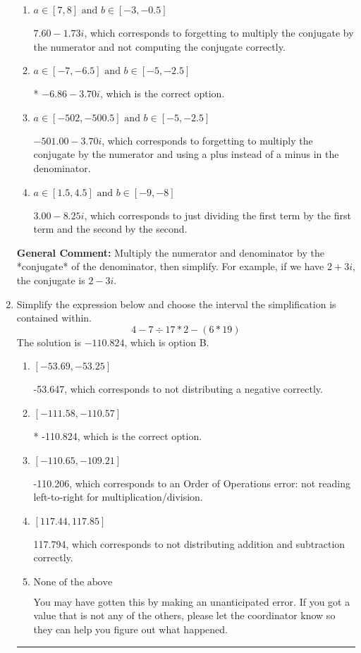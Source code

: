 \documentclass{extbook}[14pt]
\newcommand{\litem}[1]{\item #1

\rule{\textwidth}{0.4pt}}
\begin{document}
\begin{enumerate}
{\begin{enumerate}[label=\Alph*.]
 $-6.86  - 270.00 i$, which corresponds to forgetting to multiply the conjugate by the numerator.
\item \( a \in [7, 8] \text{ and } b \in [-3, -0.5] \)

 $7.60  - 1.73 i$, which corresponds to forgetting to multiply the conjugate by the numerator and not computing the conjugate correctly.
\item \( a \in [-7, -6.5] \text{ and } b \in [-5, -2.5] \)

* $-6.86  - 3.70 i$, which is the correct option.
\item \( a \in [-502, -500.5] \text{ and } b \in [-5, -2.5] \)

 $-501.00  - 3.70 i$, which corresponds to forgetting to multiply the conjugate by the numerator and using a plus instead of a minus in the denominator.
\item \( a \in [1.5, 4.5] \text{ and } b \in [-9, -8] \)

 $3.00  - 8.25 i$, which corresponds to just dividing the first term by the first term and the second by the second.
\end{enumerate}

\textbf{General Comment:} Multiply the numerator and denominator by the *conjugate* of the denominator, then simplify. For example, if we have $2+3i$, the conjugate is $2-3i$.
}
\litem{
Simplify the expression below and choose the interval the simplification is contained within.
\[ 4 - 7 \div 17 * 2 - (6 * 19) \]The solution is \( -110.824 \), which is option B.\begin{enumerate}[label=\Alph*.]
\item \( [-53.69, -53.25] \)

 -53.647, which corresponds to not distributing a negative correctly.
\item \( [-111.58, -110.57] \)

* -110.824, which is the correct option.
\item \( [-110.65, -109.21] \)

 -110.206, which corresponds to an Order of Operations error: not reading left-to-right for multiplication/division.
\item \( [117.44, 117.85] \)

 117.794, which corresponds to not distributing addition and subtraction correctly.
\item \( \text{None of the above} \)

 You may have gotten this by making an unanticipated error. If you got a value that is not any of the others, please let the coordinator know so they can help you figure out what happened.
\end{enumerate}

}
\end{enumerate}
\end{document}
